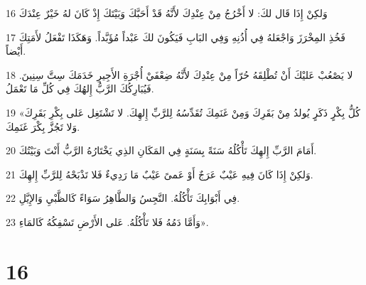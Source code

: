 \par 16 وَلكِنْ إِذَا قَال لكَ: لا أَخْرُجُ مِنْ عِنْدِكَ لأَنَّهُ قَدْ أَحَبَّكَ وَبَيْتَكَ إِذْ كَانَ لهُ خَيْرٌ عِنْدَكَ
\par 17 فَخُذِ المِخْرَزَ وَاجْعَلهُ فِي أُذُنِهِ وَفِي البَابِ فَيَكُونَ لكَ عَبْداً مُؤَبَّداً. وَهَكَذَا تَفْعَلُ لأَمَتِكَ أَيْضاً.
\par 18 لا يَصْعُبْ عَليْكَ أَنْ تُطْلِقَهُ حُرّاً مِنْ عِنْدِكَ لأَنَّهُ ضِعْفَيْ أُجْرَةِ الأَجِيرِ خَدَمَكَ سِتَّ سِنِينَ. فَيُبَارِكُكَ الرَّبُّ إِلهُكَ فِي كُلِّ مَا تَعْمَلُ.
\par 19 «كُلُّ بِكْرٍ ذَكَرٍ يُولدُ مِنْ بَقَرِكَ وَمِنْ غَنَمِكَ تُقَدِّسُهُ لِلرَّبِّ إِلهِكَ. لا تَشْتَغِل عَلى بِكْرِ بَقَرِكَ وَلا تَجُزَّ بِكْرَ غَنَمِكَ.
\par 20 أَمَامَ الرَّبِّ إِلهِكَ تَأْكُلُهُ سَنَةً بِسَنَةٍ فِي المَكَانِ الذِي يَخْتَارُهُ الرَّبُّ أَنْتَ وَبَيْتُكَ.
\par 21 وَلكِنْ إِذَا كَانَ فِيهِ عَيْبٌ عَرَجٌ أَوْ عَمىً عَيْبٌ مَا رَدِيءٌ فَلا تَذْبَحْهُ لِلرَّبِّ إِلهِكَ.
\par 22 فِي أَبْوَابِكَ تَأْكُلُهُ. النَّجِسُ وَالطَّاهِرُ سَوَاءً كَالظَّبْيِ وَالإِيَّلِ.
\par 23 وَأَمَّا دَمُهُ فَلا تَأْكُلُهُ. عَلى الأَرْضِ تَسْفِكُهُ كَالمَاءِ».

\chapter{16}

